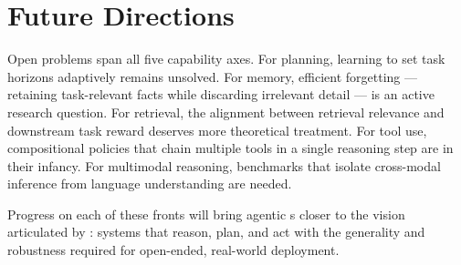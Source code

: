 \section{Future Directions}
\label{sec:conclusion-future}

Open problems span all five capability axes.
For planning, learning to set task horizons adaptively remains unsolved.
For memory, efficient forgetting — retaining task-relevant facts while
discarding irrelevant detail — is an active research question.
For retrieval, the alignment between retrieval relevance and downstream
task reward deserves more theoretical treatment.
For tool use, compositional policies that chain multiple tools in a single
reasoning step are in their infancy.
For multimodal reasoning, benchmarks that isolate cross-modal inference
from language understanding are needed.

Progress on each of these fronts will bring agentic \LLM{}s closer to the
vision articulated by \cite{wei2026agenticreasoning}: systems that reason,
plan, and act with the generality and robustness required for open-ended,
real-world deployment.
